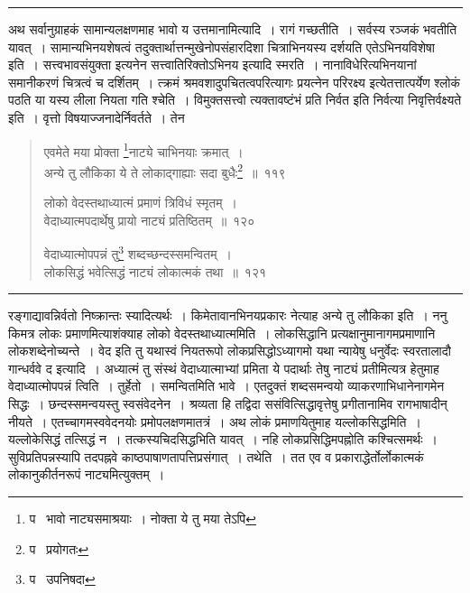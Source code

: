 \documentclass[11pt, openany]{book}
\begin{document}
\hrule

\vspace{2mm}
अथ सर्वानुग्राहकं सामान्यलक्षणमाह भावो य उत्तमानामित्यादि~। रागं गच्छतीति~। सर्वस्य रञ्जकं भवतीति यावत्~। सामान्यभिनयशेषत्वं तदुक्तार्थात्तन्मुखेनोपसंहारदिशा चित्राभिनयस्य दर्शयति एतेऽभिनयविशेषा इति~। सत्त्वभावसंयुक्ता इत्यनेन सत्त्वातिरिक्तोऽभिनय इत्यादि स्मरति~। नानाविधेरित्यभिनयानां समानीकरणं चित्रत्वं च दर्शितम्~। त्क्रमं श्रमवशादुपचितत्वपरित्यागः प्रयत्नेन परिरक्ष्य इत्येतत्तात्पर्येण श्लोकं पठति या यस्य लीला नियता गति श्चेति~। विमुक्तसत्त्वो त्यक्तावष्टंभं प्रति निर्वत इति निर्वत्या निवृत्तिर्वक्ष्यते इति~। वृत्तो विषयाज्जनादेर्निवर्तते~। तेन

\newpage

\begin{quote}
{\na एवमेते मया प्रोक्ता \renewcommand{\thefootnote}{1}\footnote{प \textendash\  भावो नाट्यसमाश्रयाः~। नोक्ता ये तु मया तेऽपि}नाट्ये चाभिनयाः क्रमात्~।\\
अन्ये तु लौकिका ये ते लोकाद्गाह्याः सदा बुधैः\renewcommand{\thefootnote}{2}\footnote{प \textendash\  प्रयोगतः}~॥~११९

लोको वेदस्तथाध्यात्मं प्रमाणं त्रिविधं स्मृतम्~।\\
वेदाध्यात्मपदार्थेषु प्रायो नाट्यं प्रतिष्ठितम्~॥~१२०

वेदाध्यात्मोपपन्नं तु\renewcommand{\thefootnote}{3}\footnote{प \textendash\  उपनिषदा} शब्दच्छन्दस्समन्वितम्~।\\
लोकसिद्धं भवेत्सिद्धं नाट्यं लोकात्मकं तथा~॥~१२१}
\end{quote}

\hrule

\vspace{2mm}
\noindent
रङ्गाद्यावन्निर्वतो निष्क्रान्तः स्यादित्यर्थः~। किमेतावानभिनयप्रकारः नेत्याह अन्ये तु लौकिका इति~। ननु किमत्र लोकः प्रमाणमित्याशंक्याह लोको वेदस्तथाध्यात्ममिति~। लोकसिद्धानि प्रत्यक्षानुमानागमप्रमाणानि लोकशब्देनोच्यन्ते~। वेद इति तु यथास्वं नियतरूपो लोकप्रसिद्धोऽध्यागमो यथा न्यायेषु धनुर्वेदः स्वरतालादौ गान्धर्ववे द इत्यादि~। अध्यात्मं तु संस्थं वेदाध्यात्माभ्यां प्रमिता ये पदार्थाः तेषु नाट्यं प्रतीमित्यत्र हेतुमाह वेदाध्यात्मोपपन्नं त्विति~। तुर्हेतो~। समन्वितमिति भावे~। एतदुक्तं शब्दसमन्वयो व्याकरणाभिधानेनागमेन सिद्धः~। छन्दस्समन्वयस्तु स्वसंवेदनेन~। श्रव्यता हि तद्विदा ससंवित्सिद्धावृत्तेषु प्रगीतानामिव रागभाषादीन् नीयते~। एतच्चागमस्ववेदनयोः प्रमोपलक्षणमातत्रं~। अथ लोकं प्रमाणयितुमाह यल्लोकसिद्धमिति~। यल्लोकेसिद्धं तत्सिद्धं न~। तत्कस्यचिदसिद्धभिति यावत्~। नहि लोकप्रसिद्धिमपह्नोति कश्चित्समर्थः~। सुविप्रतिपन्नस्यापि तदपह्नवे काष्ठपाषाणतापत्तिप्रसंगात्~। तथेति~। तत एव व प्रकाराद्धेर्तोर्लोकात्मकं लोकानुकीर्तनरूपं नाट्यमित्युक्तम्~।
\end{document}
